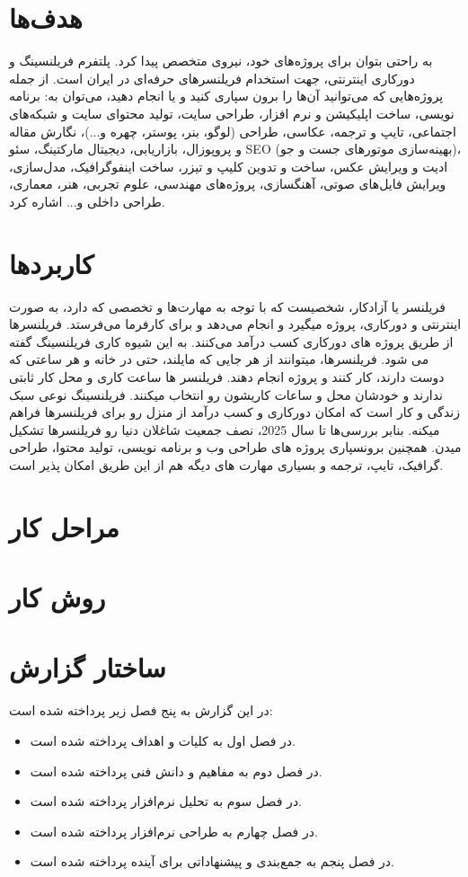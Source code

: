 \section{هدف‌ها}
به راحتی بتوان برای پروژه‌های خود، نیروی متخصص پیدا کرد.
 پلتفرم فریلنسینگ و دورکاری اینترنتی، جهت استخدام فریلنسرهای حرفه‌ای در ایران است. از جمله پروژه‌هایی که می‌توانید آن‌ها را برون سپاری کنید و یا انجام دهید، می‌توان به: برنامه نویسی، ساخت اپلیکیشن و نرم افزار، طراحی سایت، تولید محتوای سایت و شبکه‌های اجتماعی، تایپ و ترجمه، عکاسی، طراحی (لوگو، بنر، پوستر، چهره و...)، نگارش مقاله و پروپوزال، بازاریابی، دیجیتال مارکتینگ، سئو SEO (بهینه‌سازی موتورهای جست و جو)، ادیت و ویرایش عکس، ساخت و تدوین کلیپ و تیزر، ساخت اینفوگرافیک، مدل‌سازی، ویرایش فایل‌های صوتی، آهنگسازی، پروژه‌های مهندسی، علوم تجربی، هنر، معماری، طراحی داخلی و... اشاره کرد.

\section{کاربردها}
فریلنسر یا آزادکار، شخصیست که با توجه به مهارت‌ها و تخصصی که دارد، به صورت اینترنتی و دورکاری، پروژه میگیرد و انجام می‌دهد و برای کارفرما می‌فرستد. فریلنسرها از طریق پروژه های دورکاری کسب درآمد می‌کنند. به این شیوه کاری فریلنسینگ گفته می شود. فریلنسرها، میتوانند از هر جایی که مایلند، حتی در خانه و هر ساعتی که دوست دارند، کار کنند و پروژه انجام دهند. فریلنسر ها ساعت کاری و محل کار ثابتی ندارند و خودشان محل و ساعات کاریشون رو انتخاب میکنند. فریلنسینگ نوعی سبک زندگی و کار است که امکان دورکاری و کسب درآمد از منزل رو برای فریلنسرها فراهم میکنه. بنابر بررسی‌ها تا سال 2025، نصف جمعیت شاغلان دنیا رو فریلنسرها تشکیل میدن. همچنین برونسپاری پروژه های طراحی وب و برنامه نویسی، تولید محتوا، طراحی گرافیک، تایپ، ترجمه و بسیاری مهارت های دیگه هم از این طریق امکان پذیر است.
\section{مراحل کار}

\section{روش کار}

\section{ساختار گزارش}
در این گزارش به پنج فصل زیر پرداخته شده است:
\begin{itemize}
	\item
	در فصل اول به کلیات و اهداف پرداخته شده است.
	\item
	در فصل دوم به مفاهیم و دانش فنی پرداخته شده است.
	\item
	در فصل سوم به تحلیل نرم‌افزار پرداخته شده است.
	\item
	در فصل چهارم به طراحی نرم‌افزار پرداخته شده است.
	\item
	در فصل پنجم به جمع‌بندی و پیشنهاداتی برای آینده پرداخته شده است.
\end{itemize}
